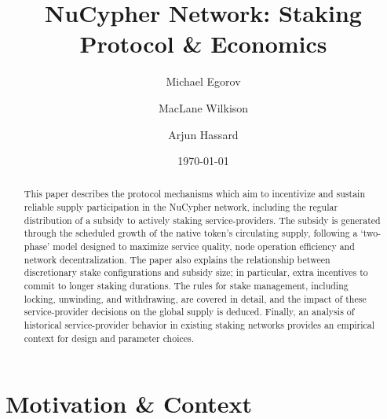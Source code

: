 \documentclass[longbibliography,nofootinbib]{revtex4-1}
\begin{document}
\title{NuCypher Network: Staking Protocol \& Economics}

\author{Michael Egorov}
\author{MacLane Wilkison}
\author{Arjun Hassard}

\begin{abstract}
This paper describes the protocol mechanisms which aim to incentivize and sustain reliable supply participation in the NuCypher network, including the regular distribution of a subsidy to actively staking service-providers. The subsidy is generated through the scheduled growth of the native token's circulating supply, following a `two-phase' model designed to maximize service quality, node operation efficiency and network decentralization. The paper also explains the relationship between discretionary stake configurations and subsidy size; in particular, extra incentives to commit to longer staking durations. The rules for stake management, including locking, unwinding, and withdrawing, are covered in detail, and the impact of these service-provider decisions on the global supply is deduced. Finally, an analysis of historical service-provider behavior in existing staking networks provides an empirical context for design and parameter choices.
\end{abstract}

\date{\today}
\maketitle

\section{Motivation \& Context}
\end{document}
